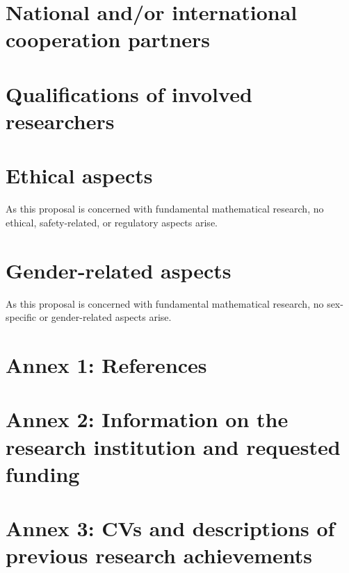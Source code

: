 \documentclass[a4paper,11pt]{scrartcl}
\begin{document}
\section{National and/or international cooperation partners}\label{sec:cooperations}


\section{Qualifications of involved researchers}\label{sec:qualifications}

\section{Ethical aspects}\label{sec:ethics}

As this proposal is concerned with fundamental mathematical research, no ethical, safety-related, or regulatory aspects arise.

\section{Gender-related aspects}\label{sec:gender}

As this proposal is concerned with fundamental mathematical research, no sex-specific or gender-related aspects arise.


\newpage
\section*{Annex 1: References}

\printbibliography[heading=none]

\newpage
\section*{Annex 2: Information on the research institution and requested funding}

\newpage
\section*{Annex 3: CVs and descriptions of previous research achievements}
\end{document}
